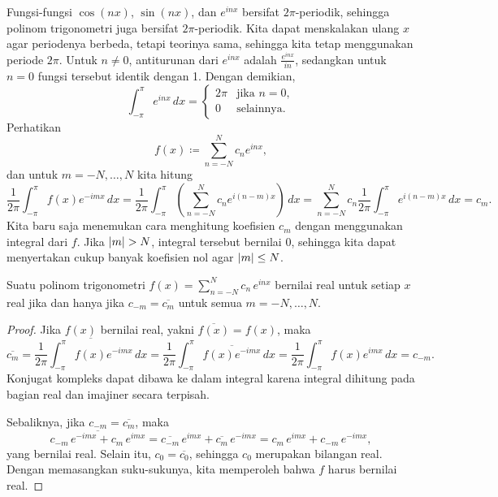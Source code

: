 \medskip

Fungsi-fungsi $\cos (nx)$, $\sin (nx)$, dan $e^{inx}$ bersifat
$2\pi$-periodik, sehingga
polinom
trigonometri juga bersifat $2\pi$-periodik.
Kita dapat menskalakan ulang $x$ agar periodenya berbeda, tetapi teorinya
sama, sehingga kita tetap menggunakan periode $2\pi$.
Untuk $n \neq 0$, antiturunan dari $e^{inx}$ adalah $\frac{e^{inx}}{in}$,
sedangkan untuk $n=0$ fungsi tersebut identik dengan 1. Dengan demikian,
\begin{equation*}
\int_{-\pi}^\pi e^{inx} \, dx =
\begin{cases}
2\pi & \text{jika } n=0, \\
0    & \text{selainnya.}
\end{cases}
\end{equation*}
Perhatikan
\begin{equation*}
f(x) \coloneqq \sum_{n=-N}^N c_n e^{inx} ,
\end{equation*}
dan untuk $m=-N,\ldots,N$ kita hitung
\begin{equation*}
\frac{1}{2\pi} \int_{-\pi}^\pi
f(x) e^{-imx} \, dx
=
\frac{1}{2\pi} \int_{-\pi}^\pi
\left(\sum_{n=-N}^N c_n e^{i(n-m)x}\right) \, dx
=
\sum_{n=-N}^N
c_n
\frac{1}{2\pi}
\int_{-\pi}^\pi
e^{i(n-m)x}
 \, dx
=
c_m .
\end{equation*}
Kita baru saja menemukan cara menghitung koefisien $c_m$ dengan menggunakan integral
dari $f$. Jika $\lvert {m} \rvert > N$, integral tersebut bernilai 0, sehingga kita dapat
menyertakan cukup banyak koefisien nol agar $\lvert {m} \rvert \leq N$.

\begin{prop}
Suatu polinom trigonometri
$f(x) = \sum_{n=-N}^N c_n\, e^{inx}$
bernilai real untuk setiap $x$ real jika dan hanya jika
$c_{-m} = \overline{c_m}$ untuk semua $m=-N,\ldots,N$.
\end{prop}

\begin{proof}
Jika $f(x)$ bernilai real, yakni $\overline{f(x)} = f(x)$, maka
\begin{equation*}
\overline{c_m}
=
\overline{
\frac{1}{2\pi} \int_{-\pi}^\pi
f(x) e^{-imx} \, dx
}
=
\frac{1}{2\pi} \int_{-\pi}^\pi
\overline{
f(x) e^{-imx} } \, dx
=
\frac{1}{2\pi} \int_{-\pi}^\pi
f(x) e^{imx} \, dx
= c_{-m} .
\end{equation*}
Konjugat kompleks dapat dibawa ke dalam integral karena integral dihitung
pada bagian real dan imajiner secara terpisah.

Sebaliknya, jika
$c_{-m} = \overline{c_m}$, maka
\begin{equation*}
\overline{c_{-m}\, e^{-imx}+ c_{m}\, e^{imx}}
=
\overline{c_{-m}}\, e^{imx}+ \overline{c_{m}}\, e^{-imx}
=
c_{m}\, e^{imx}+ c_{-m}\, e^{-imx} ,
\end{equation*}
yang bernilai real. Selain itu, $c_0 = \overline{c_0}$, sehingga
$c_0$ merupakan bilangan real.
Dengan memasangkan suku-sukunya, kita memperoleh bahwa $f$ harus bernilai real.
\end{proof}

